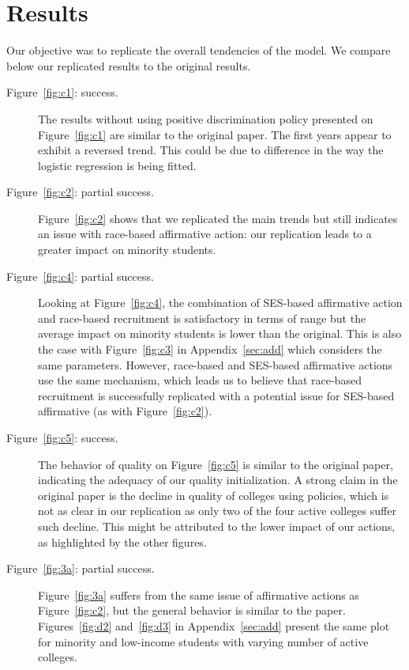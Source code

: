 \section{Results}\label{sec:results}

Our objective was to replicate the overall tendencies of the model.
We compare below our replicated results to the original results.

\begin{description}

\item[Figure~\ref{fig:c1}: success.] The results without using positive discrimination policy presented on Figure~\ref{fig:c1} are similar to the original paper.
The first years appear to exhibit a reversed trend. This could be due to difference in the way the logistic regression is being fitted.

\item[Figure~\ref{fig:c2}: partial success.] Figure~\ref{fig:c2} shows that we replicated the main trends but still indicates an issue with race-based affirmative action: our replication leads to a greater impact on minority students.

\item [Figure~\ref{fig:c4}: partial success.] Looking at Figure~\ref{fig:c4}, the combination of SES-based affirmative action and race-based recruitment is satisfactory in terms of range but the average impact on minority students is lower than the original. This is also the case with Figure~\ref{fig:c3} in Appendix~\ref{sec:add} which considers the same parameters.
However, race-based and SES-based affirmative actions use the same mechanism, which leads us to believe that race‐based recruitment is successfully replicated with a potential issue for SES-based affirmative (as with Figure~\ref{fig:c2}).

\item [Figure~\ref{fig:c5}: success.]  The behavior of quality on Figure~\ref{fig:c5} is similar to the original paper, indicating the adequacy of our quality initialization. A strong claim in the original paper is the decline in quality of colleges using policies, which is not as clear in our replication as only two of the four active colleges suffer such decline. This might be attributed to the lower impact of our actions, as highlighted by the other figures.

\item[Figure~\ref{fig:3a}: partial success.]  Figure~\ref{fig:3a} suffers from the same issue of affirmative actions as Figure~\ref{fig:c2}, but the general behavior is similar to the paper. Figures~\ref{fig:d2} and~\ref{fig:d3} in Appendix~\ref{sec:add} present the same plot for minority and low-income students with varying number of active colleges.


\end{description}
